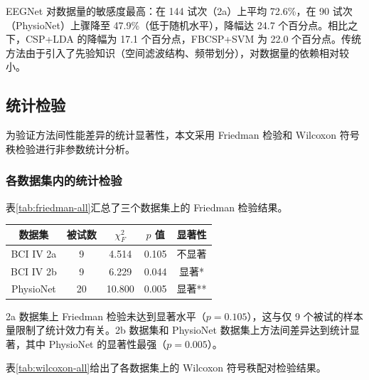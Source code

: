 EEGNet 对数据量的敏感度最高：在 144 试次（2a）上平均 72.6\%，在 90 试次（PhysioNet）上骤降至 47.9\%（低于随机水平），降幅达 24.7 个百分点。相比之下，CSP+LDA 的降幅为 17.1 个百分点，FBCSP+SVM 为 22.0 个百分点。传统方法由于引入了先验知识（空间滤波结构、频带划分），对数据量的依赖相对较小。

\subsection{统计检验}

为验证方法间性能差异的统计显著性，本文采用 Friedman 检验和 Wilcoxon 符号秩检验进行非参数统计分析。

\subsubsection{各数据集内的统计检验}

表\ref{tab:friedman-all}汇总了三个数据集上的 Friedman 检验结果。

\begin{table}[htbp]
	\centering
	\begin{tabular}{ccccc}
		\toprule
		数据集 & 被试数 & $\chi^2_F$ & $p$ 值 & 显著性 \\
		\midrule
		BCI IV 2a & 9 & 4.514 & 0.105 & 不显著 \\
		BCI IV 2b & 9 & 6.229 & 0.044 & 显著* \\
		PhysioNet & 20 & 10.800 & 0.005 & 显著** \\
		\bottomrule
	\end{tabular}
\end{table}

2a 数据集上 Friedman 检验未达到显著水平（$p = 0.105$），这与仅 9 个被试的样本量限制了统计效力有关。2b 数据集和 PhysioNet 数据集上方法间差异达到统计显著，其中 PhysioNet 的显著性最强（$p = 0.005$）。

表\ref{tab:wilcoxon-all}给出了各数据集上的 Wilcoxon 符号秩配对检验结果。

